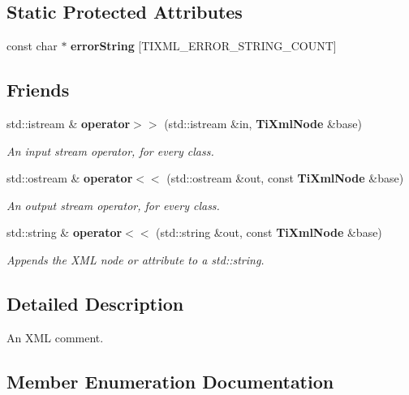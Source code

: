 \subsection*{Static Protected Attributes}
\begin{CompactItemize}
\item 
const char $\ast$ {\bf error\-String} [TIXML\_\-ERROR\_\-STRING\_\-COUNT]
\end{CompactItemize}
\subsection*{Friends}
\begin{CompactItemize}
\item 
std::istream \& {\bf operator$>$$>$} (std::istream \&in, {\bf Ti\-Xml\-Node} \&base)
\begin{CompactList}\small\item\em An input stream operator, for every class. \item\end{CompactList}\item 
std::ostream \& {\bf operator$<$$<$} (std::ostream \&out, const {\bf Ti\-Xml\-Node} \&base)
\begin{CompactList}\small\item\em An output stream operator, for every class. \item\end{CompactList}\item 
std::string \& {\bf operator$<$$<$} (std::string \&out, const {\bf Ti\-Xml\-Node} \&base)\label{classTiXmlNode_TiXmlUnknownn2}

\begin{CompactList}\small\item\em Appends the XML node or attribute to a std::string. \item\end{CompactList}\end{CompactItemize}


\subsection{Detailed Description}
An XML comment. 



\subsection{Member Enumeration Documentation}
